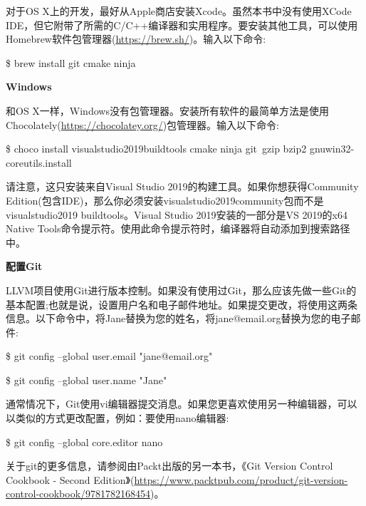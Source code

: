 对于OS X上的开发，最好从Apple商店安装Xcode。虽然本书中没有使用XCode IDE，但它附带了所需的C/C++编译器和实用程序。要安装其他工具，可以使用Homebrew软件包管理器(\url{https://brew.sh/})。输入以下命令:\par

\begin{tcolorbox}[colback=white,colframe=black]
	\$ brew install git cmake ninja
\end{tcolorbox}

\hspace*{\fill} \par %
\textbf{Windows}

和OS X一样，Windows没有包管理器。安装所有软件的最简单方法是使用Chocolately(\url{https://chocolatey.org/})包管理器。输入以下命令:\par

\begin{tcolorbox}[colback=white,colframe=black]
\$ choco install visualstudio2019buildtools cmake ninja git\
	gzip bzip2 gnuwin32-coreutils.install
\end{tcolorbox}

请注意，这只安装来自Visual Studio 2019的构建工具。如果你想获得Community Edition(包含IDE)，那么你必须安装visualstudio2019community包而不是visualstudio2019 buildtools。Visual Studio 2019安装的一部分是VS 2019的x64 Native Tools命令提示符。使用此命令提示符时，编译器将自动添加到搜索路径中。\par

\hspace*{\fill} \par %
\textbf{配置Git}

LLVM项目使用Git进行版本控制。如果没有使用过Git，那么应该先做一些Git的基本配置;也就是说，设置用户名和电子邮件地址。如果提交更改，将使用这两条信息。以下命令中，将Jane替换为您的姓名，将jane@email.org替换为您的电子邮件:\par

\begin{tcolorbox}[colback=white,colframe=black]
	\$ git config --global user.email "jane@email.org"
\end{tcolorbox}

\begin{tcolorbox}[colback=white,colframe=black]
	\$ git config --global user.name "Jane"
\end{tcolorbox}

通常情况下，Git使用vi编辑器提交消息。如果您更喜欢使用另一种编辑器，可以以类似的方式更改配置，例如：要使用nano编辑器:\par

\begin{tcolorbox}[colback=white,colframe=black]
	\$ git config --global core.editor nano
\end{tcolorbox}

关于git的更多信息，请参阅由Packt出版的另一本书，《Git Version Control Cookbook - Second Edition》(\url{https://www.packtpub.com/product/git-version-control-cookbook/9781782168454})。\par







